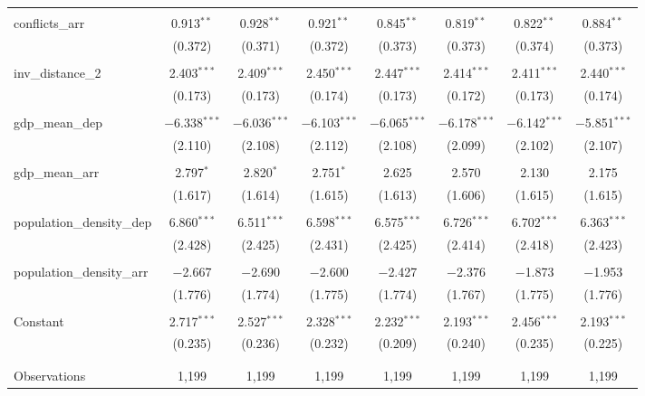\begin{table}[!htbp]
\begin{tabular}{@{\extracolsep{5pt}}lccccccc}
  & & & & & & & \\ 
 conflicts\_arr & 0.913$^{**}$ & 0.928$^{**}$ & 0.921$^{**}$ & 0.845$^{**}$ & 0.819$^{**}$ & 0.822$^{**}$ & 0.884$^{**}$ \\ 
  & (0.372) & (0.371) & (0.372) & (0.373) & (0.373) & (0.374) & (0.373) \\ 
  & & & & & & & \\ 
 inv\_distance\_2 & 2.403$^{***}$ & 2.409$^{***}$ & 2.450$^{***}$ & 2.447$^{***}$ & 2.414$^{***}$ & 2.411$^{***}$ & 2.440$^{***}$ \\ 
  & (0.173) & (0.173) & (0.174) & (0.173) & (0.172) & (0.173) & (0.174) \\ 
  & & & & & & & \\ 
 gdp\_mean\_dep & $-$6.338$^{***}$ & $-$6.036$^{***}$ & $-$6.103$^{***}$ & $-$6.065$^{***}$ & $-$6.178$^{***}$ & $-$6.142$^{***}$ & $-$5.851$^{***}$ \\ 
  & (2.110) & (2.108) & (2.112) & (2.108) & (2.099) & (2.102) & (2.107) \\ 
  & & & & & & & \\ 
 gdp\_mean\_arr & 2.797$^{*}$ & 2.820$^{*}$ & 2.751$^{*}$ & 2.625 & 2.570 & 2.130 & 2.175 \\ 
  & (1.617) & (1.614) & (1.615) & (1.613) & (1.606) & (1.615) & (1.615) \\ 
  & & & & & & & \\ 
 population\_density\_dep & 6.860$^{***}$ & 6.511$^{***}$ & 6.598$^{***}$ & 6.575$^{***}$ & 6.726$^{***}$ & 6.702$^{***}$ & 6.363$^{***}$ \\ 
  & (2.428) & (2.425) & (2.431) & (2.425) & (2.414) & (2.418) & (2.423) \\ 
  & & & & & & & \\ 
 population\_density\_arr & $-$2.667 & $-$2.690 & $-$2.600 & $-$2.427 & $-$2.376 & $-$1.873 & $-$1.953 \\ 
  & (1.776) & (1.774) & (1.775) & (1.774) & (1.767) & (1.775) & (1.776) \\ 
  & & & & & & & \\ 
 Constant & 2.717$^{***}$ & 2.527$^{***}$ & 2.328$^{***}$ & 2.232$^{***}$ & 2.193$^{***}$ & 2.456$^{***}$ & 2.193$^{***}$ \\ 
  & (0.235) & (0.236) & (0.232) & (0.209) & (0.240) & (0.235) & (0.225) \\ 
  & & & & & & & \\ 
\hline \\[-1.8ex] 
Observations & 1,199 & 1,199 & 1,199 & 1,199 & 1,199 & 1,199 & 1,199 \\ 

\end{tabular}
\end{table}
